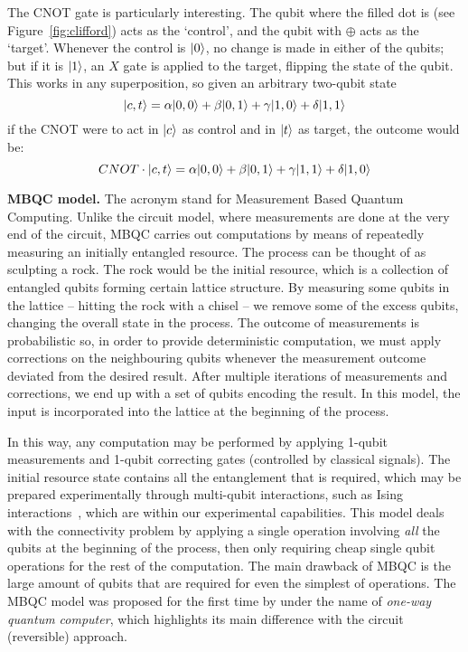 



The CNOT gate is particularly interesting. The qubit where the filled dot is (see Figure~\ref{fig:clifford}) acts as the `control', and the qubit with \(\oplus\) acts as the `target'. Whenever the control is \(\vert 0 \rangle\), no change is made in either of the qubits; but if it is \(\vert 1 \rangle\), an \(X\) gate is applied to the target, flipping the state of the qubit. This works in any superposition, so given an arbitrary two-qubit state \[\vert c,t \rangle = \alpha\vert 0,0 \rangle + \beta\vert 0,1 \rangle + \gamma\vert 1,0 \rangle + \delta\vert 1,1 \rangle\] if the CNOT were to act in \(\vert c \rangle\) as control and in \(\vert t \rangle\) as target, the outcome would be: \[CNOT \cdot \vert c,t \rangle = \alpha\vert 0,0 \rangle + \beta\vert 0,1 \rangle + \gamma\vert 1,1 \rangle + \delta\vert 1,0 \rangle\]

\textbf{MBQC model.} The acronym stand for Measurement Based Quantum Computing. Unlike the circuit model, where measurements are done at the very end of the circuit, MBQC carries out computations by means of repeatedly measuring an initially entangled resource. The process can be thought of as sculpting a rock. The rock would be the initial resource, which is a collection of entangled qubits forming certain lattice structure. By measuring some qubits in the lattice -- hitting the rock with a chisel -- we remove some of the excess qubits, changing the overall state in the process. The outcome of measurements is probabilistic so, in order to provide deterministic computation, we must apply corrections on the neighbouring qubits whenever the measurement outcome deviated from the desired result. After multiple iterations of measurements and corrections, we end up with a set of qubits encoding the result. In this model, the input is incorporated into the lattice at the beginning of the process.

In this way, any computation may be performed by applying 1-qubit measurements and 1-qubit correcting gates (controlled by classical signals). The initial resource state contains all the entanglement that is required, which may be prepared experimentally through multi-qubit interactions, such as Ising interactions~\citep{1WQC}, which are within our experimental capabilities. This model deals with the connectivity problem by applying a single operation involving \textit{all} the qubits at the beginning of the process, then only requiring cheap single qubit operations for the rest of the computation. The main drawback of MBQC is the large amount of qubits that are required for even the simplest of operations. The MBQC model was proposed for the first time by \citet{1WQC} under the name of \textit{one-way quantum computer}, which highlights its main difference with the circuit (reversible) approach. 

